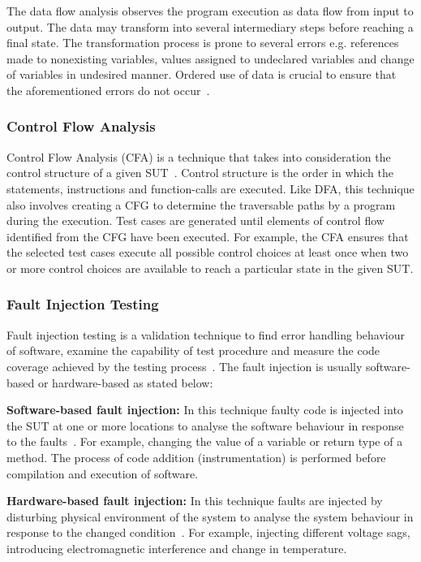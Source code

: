 The data flow analysis observes the program execution as data flow from input to output. The data may transform into several intermediary steps before reaching a final state. The transformation process is prone to several errors e.g. references made to nonexisting variables, values assigned to undeclared variables and change of variables in undesired manner. Ordered use of data is crucial to ensure that the aforementioned errors do not occur~\cite{fosdick1976data}.

\subsubsection{Control Flow Analysis}
Control Flow Analysis (CFA) is a technique that takes into consideration the control structure of a given SUT~\cite{allen1970control}. Control structure is the order in which the statements, instructions and function-calls are executed. Like DFA, this technique also involves creating a CFG to determine the traversable paths by a program during the execution. Test cases are generated until elements of control flow identified from the CFG have been executed. For example, the CFA ensures that the selected test cases execute all possible control choices at least once when two or more control choices are available to reach a particular state in the given SUT. %

\subsubsection{Fault Injection Testing}
Fault injection testing is a validation technique to find error handling behaviour of software, examine the capability of test procedure and measure the code coverage achieved by the testing process~\cite{arlat1990validation}. The fault injection is usually software-based or hardware-based as stated below:

\textbf{Software-based fault injection:} In this technique faulty code is injected into the SUT at one or more locations to analyse the software behaviour in response to the faults~\cite{voas1997software}. For example, changing the value of a variable or return type of a method. The process of code addition (instrumentation) is performed before compilation and execution of software. 

\textbf{Hardware-based fault injection:} In this technique faults are injected by disturbing physical environment of the system to analyse the system behaviour in response to the changed condition~\cite{hsueh1997fault}. For example, injecting different voltage sags, introducing electromagnetic interference and change in temperature.

